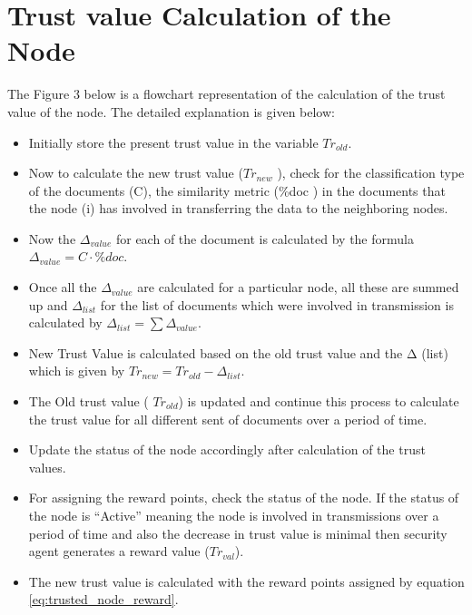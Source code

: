  \section{Trust value Calculation of the Node}
The Figure 3 below is a flowchart representation of the calculation of the trust value of the node. The detailed explanation is given below:
\begin{itemize}
    \item Initially store the present trust value in the variable \( Tr_{old} \).
    \item Now to calculate the new trust value (\( Tr_{new} \) ), check for the
    classification type of the documents (C), the similarity metric (\%doc ) in
    the documents that the node (i) has involved in transferring the data to the
    neighboring nodes.  
    \item Now the \( \Delta_{value} \) for each of the document is calculated
    by the formula  \( \Delta_{value} = C \cdot \% doc \).
    \item Once all the \( \Delta_{value} \) are calculated for a particular node, all these are
    summed up and      \( \Delta_{list} \) for the list of documents which were involved in
    transmission is calculated by \( \Delta_{list} = \sum \Delta_{value} \).  
    \item New Trust Value is calculated based on the old trust value and the Δ (list)
        which is given by \( Tr_{new} = Tr_{old} - \Delta_{list} \).
    \item The Old trust value ( \(Tr_{old} \)) is updated and continue this process to
    calculate the trust value for all different sent of documents over a period
    of time.  
    \item Update the status of the node accordingly after calculation of the
    trust values.
    \item For assigning the reward points, check the status of the node. If the status
    of the node is “Active” meaning the node is involved in transmissions over
    a period of time and also the decrease in trust value is minimal then
    security agent generates a reward value      (\( Tr_{val} \)).  
    \item The new trust value is calculated with the reward points assigned by
        equation \ref{eq:trusted_node_reward}.
\end{itemize}

